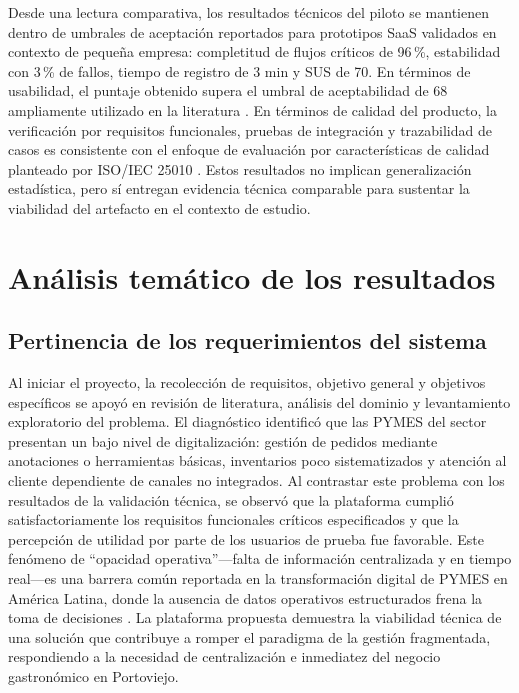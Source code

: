 Desde una lectura comparativa, los resultados técnicos del piloto se mantienen dentro de umbrales de aceptación reportados para prototipos SaaS validados en contexto de pequeña empresa: completitud de flujos críticos de 96\,\%, estabilidad con 3\,\% de fallos, tiempo de registro de 3 min y SUS de 70. En términos de usabilidad, el puntaje obtenido supera el umbral de aceptabilidad de 68 ampliamente utilizado en la literatura \parencite{Bangor2009, Lewis2018}. En términos de calidad del producto, la verificación por requisitos funcionales, pruebas de integración y trazabilidad de casos es consistente con el enfoque de evaluación por características de calidad planteado por ISO/IEC 25010 \parencite{ISO25010_2011}. Estos resultados no implican generalización estadística, pero sí entregan evidencia técnica comparable para sustentar la viabilidad del artefacto en el contexto de estudio.

\section{Análisis temático de los resultados}

\subsection{Pertinencia de los requerimientos del sistema}

Al iniciar el proyecto, la recolección de requisitos, objetivo general y objetivos específicos se apoyó en revisión de literatura, análisis del dominio y levantamiento exploratorio del problema. El diagnóstico identificó que las PYMES del sector presentan un bajo nivel de digitalización: gestión de pedidos mediante anotaciones o herramientas básicas, inventarios poco sistematizados y atención al cliente dependiente de canales no integrados. Al contrastar este problema con los resultados de la validación técnica, se observó que la plataforma cumplió satisfactoriamente los requisitos funcionales críticos especificados y que la percepción de utilidad por parte de los usuarios de prueba fue favorable. Este fenómeno de ``opacidad operativa''---falta de información centralizada y en tiempo real---es una barrera común reportada en la transformación digital de PYMES en América Latina, donde la ausencia de datos operativos estructurados frena la toma de decisiones \parencite{GonzalezMartinez2021}. La plataforma propuesta demuestra la viabilidad técnica de una solución que contribuye a romper el paradigma de la gestión fragmentada, respondiendo a la necesidad de centralización e inmediatez del negocio gastronómico en Portoviejo.


